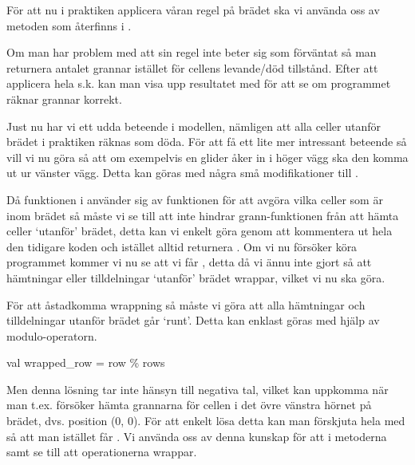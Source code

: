         För att nu i praktiken applicera våran regel på brädet ska vi använda oss av metoden  som återfinns i .

        Om man har problem med att sin regel inte beter sig som förväntat så man returnera antalet grannar istället för cellens levande/död tillstånd. Efter att applicera hela s.k.  kan man visa upp resultatet med  för att se om programmet räknar grannar korrekt.


    Just nu har vi ett udda beteende i modellen, nämligen att alla celler utanför brädet i praktiken räknas som döda. För att få ett lite mer intressant beteende så vill vi nu göra så att om exempelvis en glider åker in i höger vägg ska den komma ut ur vänster vägg. Detta kan göras med några små modifikationer till .


        Då funktionen  i  använder sig av funktionen  för att avgöra vilka celler som är inom brädet så måste vi se till att  inte hindrar grann-funktionen från att hämta celler `utanför' brädet, detta kan vi enkelt göra genom att kommentera ut hela den tidigare koden och istället alltid returnera . Om vi nu försöker köra programmet kommer vi nu se att vi får , detta då vi ännu inte gjort så att hämtningar eller tilldelningar `utanför' brädet wrappar, vilket vi nu ska göra.

        För att åstadkomma wrappning så måste vi göra att alla hämtningar och tilldelningar utanför brädet går `runt'. Detta kan enklast göras med hjälp av modulo-operatorn.
        
\begin{Code}
val wrapped_row = row \% rows
\end{Code}

	Men denna lösning tar inte hänsyn till negativa tal, vilket kan uppkomma när man t.ex. försöker hämta grannarna för cellen i det övre vänstra hörnet på brädet, dvs. position (0, 0). För att enkelt lösa detta kan man förskjuta hela  med  så att man istället får . Vi använda oss av denna kunskap för att i metoderna  samt  se till att operationerna wrappar.


